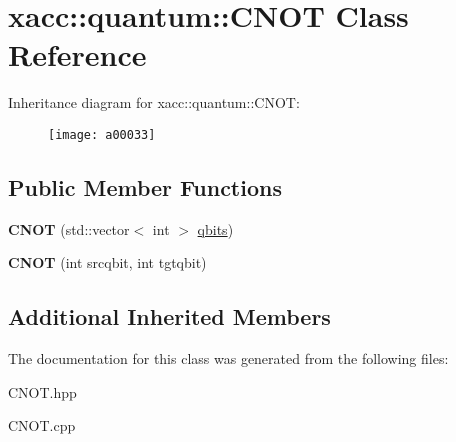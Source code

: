 \hypertarget{a00033}{}\section{xacc\+:\+:quantum\+:\+:C\+N\+OT Class Reference}
\label{a00033}
Inheritance diagram for xacc\+:\+:quantum\+:\+:C\+N\+OT\+:\begin{figure}[H]
\begin{center}
\leavevmode
\texttt{[image: a00033]}
\end{center}
\end{figure}
\subsection*{Public Member Functions}
\begin{DoxyCompactItemize}
\item 
{\bfseries C\+N\+OT} (std\+::vector$<$ int $>$ \hyperlink{a00062_a2a56be6c2519ea65df4d06f4abae1393}{qbits})\hypertarget{a00033_ad3d460779a27affa317dd4f3a88268b3}{}\label{a00033_ad3d460779a27affa317dd4f3a88268b3}

\item 
{\bfseries C\+N\+OT} (int srcqbit, int tgtqbit)\hypertarget{a00033_a15efcb44477dde4b6151fe1776a73ddc}{}\label{a00033_a15efcb44477dde4b6151fe1776a73ddc}

\end{DoxyCompactItemize}
\subsection*{Additional Inherited Members}


The documentation for this class was generated from the following files\+:\begin{DoxyCompactItemize}
\item 
C\+N\+O\+T.\+hpp\item 
C\+N\+O\+T.\+cpp\end{DoxyCompactItemize}
